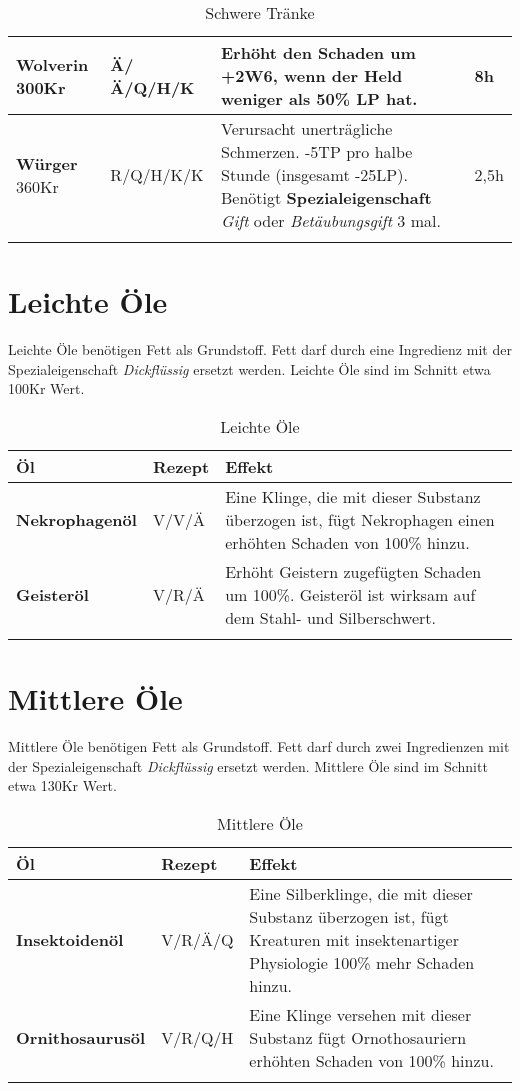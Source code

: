 \begin{longtable}{|p{3cm}|p{}|p{8cm}|p{}|}
\textbf{Wolverin} \newline 300Kr & Ä/Ä/Q/H/K & Erhöht den Schaden um +2W6, wenn der Held weniger als 50\% LP hat. & 8h \\ \hline

\textbf{Würger} \newline 360Kr & R/Q/H/K/K & Verursacht unerträgliche Schmerzen. -5TP pro halbe Stunde (insgesamt -25LP). Benötigt \textbf{Spezialeigenschaft} \textit{Gift} oder \textit{Betäubungsgift} 3 mal. & 2,5h \\ \hline

\caption{Schwere Tränke}
\label{tab:schwere_traenke}
\end{longtable}


\section{Leichte Öle}
Leichte Öle benötigen Fett als Grundstoff. Fett darf durch eine Ingredienz mit der Spezialeigenschaft \textit{Dickflüssig} ersetzt werden. Leichte Öle sind im Schnitt etwa 100Kr Wert.

\begin{longtable}{|p{4cm}|p{}|p{9cm}|}
\hline
\textbf{Öl} & \textbf{Rezept} & \textbf{Effekt} \\ \hline

\textbf{Nekrophagenöl} & V/V/Ä & Eine Klinge, die mit dieser Substanz überzogen ist, fügt Nekrophagen einen erhöhten Schaden von 100\% hinzu. \\ \hline

\textbf{Geisteröl} & V/R/Ä & Erhöht Geistern zugefügten Schaden um 100\%. Geisteröl ist wirksam auf dem Stahl- und Silberschwert.  \\ \hline

\caption{Leichte Öle}
\label{tab:leichte_oele}
\end{longtable}


\section{Mittlere Öle}
Mittlere Öle benötigen Fett als Grundstoff. Fett darf durch zwei Ingredienzen mit der Spezialeigenschaft \textit{Dickflüssig} ersetzt werden. Mittlere Öle sind im Schnitt etwa 130Kr Wert.

\begin{longtable}{|p{4cm}|p{}|p{9cm}|}
\hline
\textbf{Öl} & \textbf{Rezept} & \textbf{Effekt} \\ \hline

\textbf{Insektoidenöl} & V/R/Ä/Q & Eine Silberklinge, die mit dieser Substanz überzogen ist, fügt Kreaturen mit insektenartiger Physiologie 100\% mehr Schaden hinzu. \\ \hline

\textbf{Ornithosaurusöl} & V/R/Q/H & Eine Klinge versehen mit dieser Substanz fügt Ornothosauriern erhöhten Schaden von 100\% hinzu.  \\ \hline

\caption{Mittlere Öle}
\label{tab:mittlere_oele}
\end{longtable}



